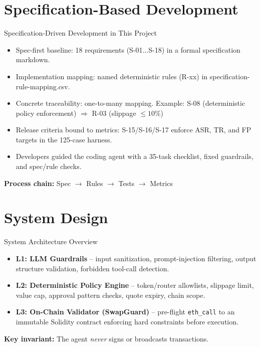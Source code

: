 \documentclass{beamer}
\begin{document}
\section{Specification-Based Development}

\begin{frame}{Specification-Driven Development in This Project}
\begin{itemize}
  \item Spec-first baseline: 18 requirements (S-01...S-18) in a formal specification markdown.
  \item Implementation mapping: named deterministic rules (R-xx) in specification-rule-mapping.csv.
  \item Concrete traceability: one-to-many mapping. Example: S-08 (deterministic policy enforcement) $\Rightarrow$ R-03 (slippage $\leq 10\%$)
  \item Release criteria bound to metrics: S-15/S-16/S-17 enforce ASR, TR, and FP targets in the 125-case harness.
  \item Developers guided the coding agent with a 35-task checklist, fixed guardrails, and spec/rule checks.
\end{itemize}
\vspace{0.3em}
\textbf{Process chain:} Spec $\rightarrow$ Rules $\rightarrow$ Tests $\rightarrow$ Metrics
\end{frame}

\section{System Design}

\begin{frame}{System Architecture Overview}
\begin{itemize}
  \item \textbf{L1: LLM Guardrails} -- input sanitization, prompt-injection filtering, output structure validation, forbidden tool-call detection.
  \item \textbf{L2: Deterministic Policy Engine} -- token/router allowlists, slippage limit, value cap, approval pattern checks, quote expiry, chain scope.
  \item \textbf{L3: On-Chain Validator (SwapGuard)} -- pre-flight \texttt{eth\_call} to an immutable Solidity contract enforcing hard constraints before execution.
\end{itemize}
\vspace{0.3em}
\textbf{Key invariant:} The agent \emph{never} signs or broadcasts transactions.
\end{frame}
\end{document}
